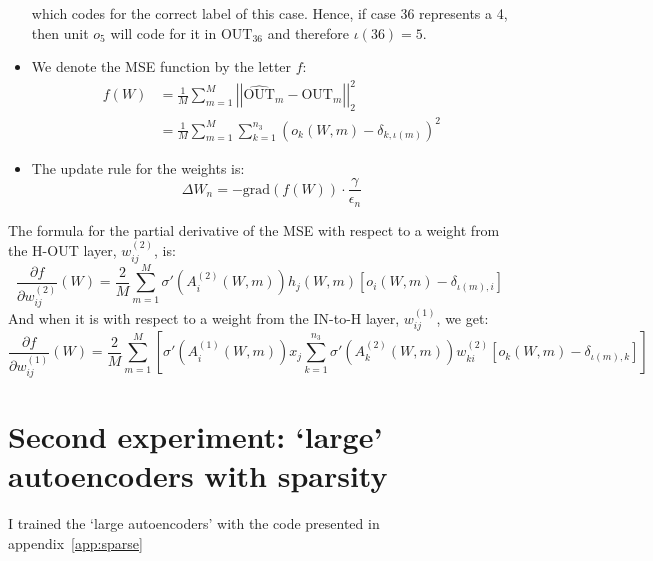 \documentclass{article}
\newcommand{\lp}{\left(}
\newcommand{\rp}{\right)}
\begin{document}
\begin{itemize}
which codes for the correct label of this case. Hence, if case 36 represents a 4, then unit $o_5$ will code
for it in $\text{OUT}_{36}$ and therefore $\iota(36)=5$.
\item We denote the MSE function by the letter $f$:
\begin{align}
f(W)&=\frac{1}{M}\sum_{m=1}^{M}\left |\left| \widehat{\text{OUT}}_m-\text{OUT}_m \right |\right |_2^2\\
	&=\frac{1}{M}\sum_{m=1}^M \sum_{k=1}^{n_3}\lp o_{k}(W,m)-\delta_{k,\iota(m)}\rp^2
\end{align}
\item The update rule for the weights is:
\[
\Delta W_n=-\text{grad} \lp f(W)\rp\cdot \frac{\gamma}{\epsilon_n}
\]
\end{itemize}
The formula for the partial derivative of the MSE with respect to a weight from the H-OUT layer, $w^{(2)}_{ij}$, is:
\begin{equation}
\frac{\partial f}{\partial w^{(2)}_{ij}}(W)=\frac{2}{M}\sum_{m=1}^M\sigma'\left(A_i^{(2)}(W,m)\right)h_j(W,m)\left[o_i(W,m)-\delta_{\iota(m),i}\right] \label{one}
\end{equation}
And when it is with respect to a weight from the IN-to-H layer, $w^{(1)}_{ij}$, we get:
\begin{equation}
\frac{\partial f}{\partial w^{(1)}_{ij}}(W)=\frac{2}{M}
\sum_{m=1}^M\left[\sigma'\left(A_i^{(1)}(W,m)\right)x_j
\sum_{k=1}^{n_3}\sigma'\left(A_k^{(2)}(W,m)\right) w^{(2)}_{ki}\left[o_k(W,m)-\delta_{\iota(m),k}\right] \right]\label{two}
\end{equation}
\section{Second experiment: `large' autoencoders with sparsity}
I trained the `large autoencoders' with the code presented in appendix~\ref{app:sparse}
\end{document}
